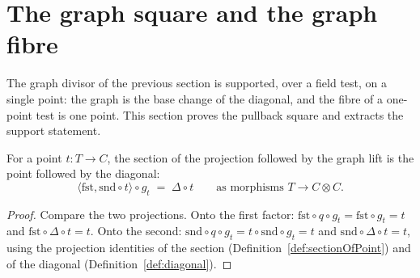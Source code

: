 \section{The graph square and the graph fibre}
\label{sec:graphFibre}

The graph divisor of the previous section is supported, over a field test, on a single
point: the graph is the base change of the diagonal, and the fibre of a one-point test is
one point. This section proves the pullback square and extracts the support statement.

\begin{lemma}
  \label{lem:sectionOfPoint_comp_graphLift}
  \leanok
  For a point \(t \colon T \to C\), the section of the projection followed by the graph
  lift is the point followed by the diagonal:
  \[
    \langle \mathrm{fst}, \mathrm{snd} \circ t\rangle \circ g_t
      \;=\; \Delta \circ t
    \qquad\text{as morphisms } T \to C \otimes C .
  \]
\end{lemma}
\begin{proof}
  \leanok
  Compare the two projections. Onto the first factor: \(\mathrm{fst} \circ q \circ g_t =
  \mathrm{fst} \circ g_t = t\) and \(\mathrm{fst} \circ \Delta \circ t = t\). Onto the
  second: \(\mathrm{snd} \circ q \circ g_t = t \circ \mathrm{snd} \circ g_t = t\) and
  \(\mathrm{snd} \circ \Delta \circ t = t\), using the projection identities of the section
  (Definition~\ref{def:sectionOfPoint}) and of the diagonal (Definition~\ref{def:diagonal}).
\end{proof}

